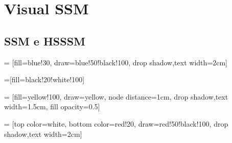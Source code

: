 \documentclass[../main.tex]{subfiles}
\begin{document}

\chapter{Visual SSM}
\PartialToc

\section{SSM e HSSSM}

\begingroup %

 = [fill=blue!30, draw=blue!50!black!100, drop shadow,text width=2cm]

=[fill=black!20!white!100]

 = [fill=yellow!100, draw=yellow, node distance=1cm, drop shadow,text width=1.5cm, fill opacity=0.5]

 = [top color=white, bottom color=red!20, draw=red!50!black!100, drop shadow,text width=2cm]
\end{document}
